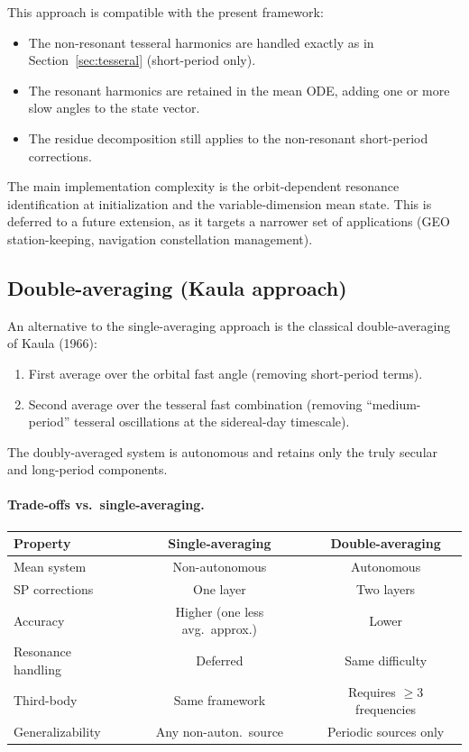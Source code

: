 \documentclass[11pt]{article}
\begin{document}
This approach is compatible with the present framework:
\begin{itemize}
\item The non-resonant tesseral harmonics are handled exactly as in
Section~\ref{sec:tesseral} (short-period only).
\item The resonant harmonics are retained in the mean ODE, adding one or
more slow angles to the state vector.
\item The residue decomposition still applies to the non-resonant
short-period corrections.
\end{itemize}

The main implementation complexity is the orbit-dependent resonance
identification at initialization and the variable-dimension mean state.
This is deferred to a future extension, as it targets a narrower set of
applications (GEO station-keeping, navigation constellation management).

\subsection{Double-averaging (Kaula approach)}

An alternative to the single-averaging approach is the classical
double-averaging of Kaula (1966):
\begin{enumerate}
\item First average over the orbital fast angle (removing short-period terms).
\item Second average over the tesseral fast combination (removing
``medium-period'' tesseral oscillations at the sidereal-day timescale).
\end{enumerate}

The doubly-averaged system is autonomous and retains only the truly secular
and long-period components.

\paragraph{Trade-offs vs.\ single-averaging.}
\begin{center}
\begin{tabular}{lcc}
\toprule
Property & Single-averaging & Double-averaging \\
\midrule
Mean system & Non-autonomous & Autonomous \\
SP corrections & One layer & Two layers \\
Accuracy & Higher (one less avg.\ approx.) & Lower \\
Resonance handling & Deferred & Same difficulty \\
Third-body & Same framework & Requires $\ge 3$ frequencies \\
Generalizability & Any non-auton.\ source & Periodic sources only \\
\bottomrule
\end{tabular}
\end{center}
\end{document}
